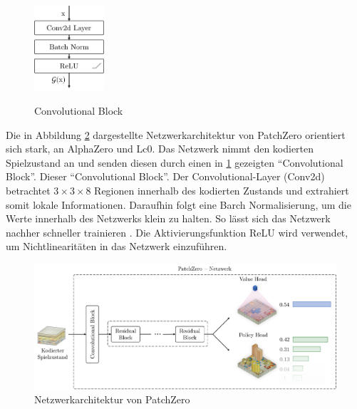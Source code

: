 \begin{figure}
    \vspace*{-0.5cm}
    \includegraphics[width=0.23\textwidth]{res/pictures/conv-block.pdf}
    \centering
    \caption[Convolutional Block]{\unskip}
    Convolutional Block
    \label{fig:conv-block}
\end{figure}

Die in Abbildung \ref{fig:patch-zero-architecture} dargestellte Netzwerkarchitektur von PatchZero orientiert sich stark, an AlphaZero und \ac{Lc0}. Das Netzwerk nimmt den kodierten Spielzustand an und senden diesen durch einen in \ref{fig:conv-block} gezeigten \enquote{Convolutional Block}. Dieser \enquote{Convolutional Block}. Der Convolutional-Layer (Conv2d) betrachtet $3\times 3 \times 8$ Regionen innerhalb des kodierten Zustands und extrahiert somit lokale Informationen. Daraufhin folgt eine Barch Normalisierung, um die Werte innerhalb des Netzwerks klein zu halten. So lässt sich das Netzwerk nachher schneller trainieren \cite{2018.BatchNorm}. Die Aktivierungsfunktion \ac{ReLU} wird verwendet, um Nichtlinearitäten in das Netzwerk einzuführen.

\begin{figure}[!ht]
    \centering
    \includegraphics[width=\textwidth]{res/pictures/patch-zero-architecture.pdf}
    \caption{Netzwerkarchitektur von PatchZero}
    \label{fig:patch-zero-architecture}
\end{figure}

